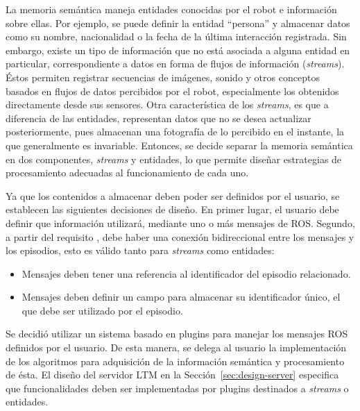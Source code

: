 La memoria semántica maneja entidades conocidas por el robot e información sobre ellas. Por ejemplo, se puede definir la entidad ``persona'' y almacenar datos como su nombre, nacionalidad o la fecha de la última interacción registrada. Sin embargo, existe un tipo de información que no está asociada a alguna entidad en particular, correspondiente a datos en forma de flujos de información (\textit{streams}). Éstos permiten registrar secuencias de imágenes, sonido y otros conceptos basados en flujos de datos percibidos por el robot, especialmente los obtenidos directamente desde sus sensores. Otra característica de los \textit{streams}, es que a diferencia de las entidades, representan datos que no se desea actualizar posteriormente, pues almacenan una fotografía de lo percibido en el instante, la que generalmente es invariable. Entonces, se decide separar la memoria semántica en dos componentes, \textit{streams} y entidades, lo que permite diseñar estrategias de procesamiento adecuadas al funcionamiento de cada uno. 


Ya que los contenidos a almacenar deben poder ser definidos por el usuario, se establecen las siguientes decisiones de diseño. En primer lugar, el usuario debe definir que información utilizará, mediante uno o más mensajes de ROS. Segundo, a partir del requisito , debe haber una conexión bidireccional entre los mensajes y los episodios, esto es válido tanto para \textit{streams} como entidades:
\begin{itemize}
\item Mensajes deben tener una referencia al identificador del episodio relacionado.
\item Mensajes deben definir un campo para almacenar su identificador único, el que debe ser utilizado por el episodio.
\end{itemize}

Se decidió utilizar un sistema basado en plugins para manejar los mensajes ROS definidos por el usuario. De esta manera, se delega al usuario la implementación de los algoritmos para adquisición de la  información semántica y procesamiento de ésta. El diseño del servidor LTM en la Sección~\ref{sec:design-server} especifica que funcionalidades deben ser implementadas por plugins destinados a \textit{streams} o entidades. 

